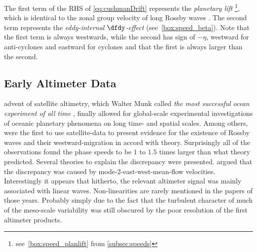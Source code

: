 The first term of the RHS of \eqref{eq:cushmanDrift} represents the \textit{planetary lift} \footnote{see~\cref{box:speed_planlift} from \cref{subsec:speeds}}, which is identical to the zonal group velocity of long Rossby waves \citet{Cushman-Roisin2010}. The second term represents the \textit{eddy-internal $\dfdy$-effect} (see~\cref{box:speed_beta}). Note that the first term is always westwards, while the second has sign of $-\eta$, \ie westward for anti-cyclones and eastward for cyclones and that the first is always larger than the second.


\subsection{Early Altimeter Data}\label{sec:hist_killworth}

  advent of satellite altimetry, which Walter Munk called \textit{the most successful ocean experiment of all time} \citet{Munk2002}, finally allowed for
global-scale experimental investigations of oceanic planetary phenomena on long time- and spatial scales. Among others,
\citet{matano1993seasonal,cipollini1997concurrent,le1993sea} were the first to use satellite-data to present evidence for the existence of Rossby waves and their
westward-migration in accord with theory. Surprisingly all of the observations found the phase speeds to be $1$ to $1.5$ times larger than what theory
predicted. Several theories to explain the discrepancy were presented. \Eg \citet{Killworth1997a} argued that the discrepancy was caused by
mode-2-east-west-mean-flow velocities. Interestingly it appears that hitherto, the relevant altimeter signal was mainly associated with linear waves.
Non-linearities are rarely mentioned in the papers of those years. Probably simply due to the fact that the turbulent character of much of the
meso-scale variability was still obscured by the poor resolution of the first altimeter products.

